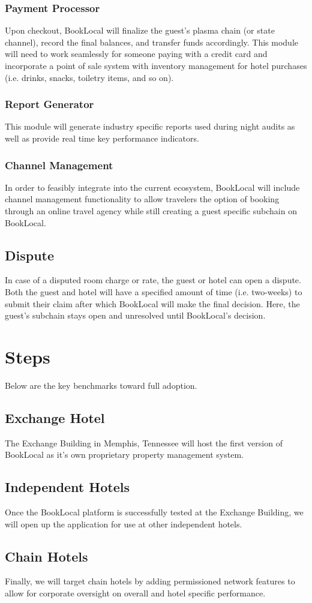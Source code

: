 \documentclass{article}
\begin{document}
\subsubsection{Payment Processor}
Upon checkout, BookLocal will finalize the guest's plasma chain (or state channel), record the final balances, and transfer funds accordingly. This module will need to work seamlessly for someone paying with a credit card and incorporate a point of sale system with inventory management for hotel purchases (i.e. drinks, snacks, toiletry items, and so on).

\subsubsection{Report Generator}
This module will generate industry specific reports used during night audits as well as provide real time key performance indicators.  

\subsubsection{Channel Management}
In order to feasibly integrate into the current ecosystem, BookLocal will include channel management functionality to allow travelers the option of booking through an online travel agency while still creating a guest specific subchain on BookLocal.   

\subsection{Dispute}
In case of a disputed room charge or rate, the guest or hotel can open a dispute. Both the guest and hotel will have a specified amount of time (i.e. two-weeks) to submit their claim after which BookLocal will make the final decision. Here, the guest's subchain stays open and unresolved until BookLocal's decision.


\newpage
\section{Steps}
Below are the key benchmarks toward full adoption. 
\subsection{Exchange Hotel}
The Exchange Building in Memphis, Tennessee will host the first version of BookLocal as it's own proprietary property management system. 
\subsection{Independent Hotels}
Once the BookLocal platform is successfully tested at the Exchange Building, we will open up the application for use at other independent hotels.
\subsection{Chain Hotels}
Finally, we will target chain hotels by adding permissioned network features to allow for corporate oversight on overall and hotel specific performance.
\end{document}
